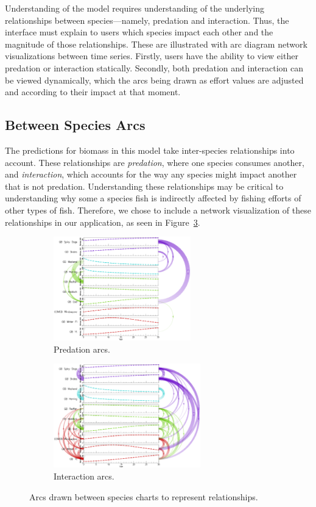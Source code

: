 Understanding of the model requires understanding of the underlying relationships between species---namely, predation and interaction.  Thus, the interface must explain to users which species impact each other and the magnitude of those relationships.  These are illustrated with arc diagram network visualizations between time series.  Firstly, users have the ability to view either predation or interaction statically.  Secondly, both predation and interaction can be viewed dynamically, which the arcs being drawn as effort values are adjusted and according to their impact at that moment.


\subsection{Between Species Arcs} 
\label{sec:betweenSpeciesArcs}

The predictions for biomass in this model take inter-species relationships into account.  These relationships are \textit{predation}, where one species consumes another, and \textit{interaction}, which accounts for the way any species might impact another that is not predation.  Understanding these relationships may be critical to understanding why some a species fish is indirectly affected by fishing efforts of other types of fish.  Therefore, we chose to include a network visualization of these relationships in our application, as seen in Figure~\ref{fig:betweenSpeciesArcs}.

\begin{figure}
\centering
	\begin{subfigure}[b]{0.48\textwidth}
		\centering
		\includegraphics[height=4.5cm]{figures/eps/arcs_predation.eps}
		\caption{Predation arcs.}
		\label{fig:arcsPredation}
	\end{subfigure}	
	\begin{subfigure}[b]{0.48\textwidth}
		\centering
		\includegraphics[height=4.5cm]{figures/eps/arcs_interaction.eps}
		\caption{Interaction arcs.}
		\label{fig:arcsInteraction}
	\end{subfigure}
	\caption{Arcs drawn between species charts to represent relationships.}
	\label{fig:betweenSpeciesArcs}
\end{figure}

